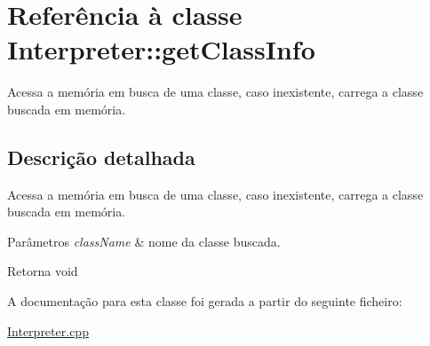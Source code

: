 \hypertarget{class_interpreter_1_1get_class_info}{}\section{Referência à classe Interpreter\+:\+:get\+Class\+Info}
\label{class_interpreter_1_1get_class_info}


Acessa a memória em busca de uma classe, caso inexistente, carrega a classe buscada em memória.  




\subsection{Descrição detalhada}
Acessa a memória em busca de uma classe, caso inexistente, carrega a classe buscada em memória. 


\begin{DoxyParams}{Parâmetros}
{\em class\+Name} & nome da classe buscada. \\
\hline
\end{DoxyParams}
\begin{DoxyReturn}{Retorna}
void 
\end{DoxyReturn}


A documentação para esta classe foi gerada a partir do seguinte ficheiro\+:\begin{DoxyCompactItemize}
\item 
\hyperlink{_interpreter_8cpp}{Interpreter.\+cpp}\end{DoxyCompactItemize}
